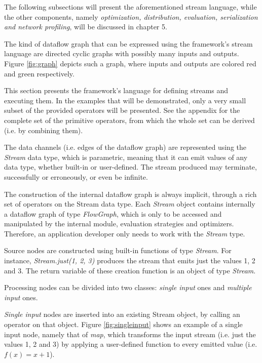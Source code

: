 \documentclass{dithesis}
\begin{document}
The following subsections will present the aforementioned stream language, while the other components, namely \textit{optimization, distribution, evaluation, serialization and network profiling}, will be discussed in chapter 5.


The kind of dataflow graph that can be expressed using the framework's stream language are directed cyclic graphs with possibly many inputs and outputs. Figure \ref{fig:graph} depicts such a graph, where inputs and outputs are colored red and green respectively.


This section presents the framework's language for defining streams and executing them. In the examples that will be demonstrated, only a very small subset of the provided operators will be presented. See the appendix for the complete set of the primitive operators, from which the whole set can be derived (i.e. by combining them).


The data channels (i.e. edges of the dataflow graph) are represented using the \textit{Stream} data type, which is parametric, meaning that it can emit values of any data type, whether built-in or user-defined. The stream produced may terminate, successfully or erroneously, or even be infinite.


The construction of the internal dataflow graph is always implicit, through a rich set of operators on the Stream data type. Each \textit{Stream} object contains internally a dataflow graph of type \textit{FlowGraph}, which is only to be accessed and manipulated by the internal module, evaluation strategies and optimizers. Therefore, an application developer only needs to work with the \textit{Stream} type.

Source nodes are constructed using built-in functions of type \textit{Stream}. For instance, \textit{Stream.just(1, 2, 3)} produces the stream that emits just the values 1, 2 and 3. The return variable of these creation function is an object of type \textit{Stream}.

Processing nodes can be divided into two classes: \textit{single input} ones and \textit{multiple input} ones. 

\textit{Single input} nodes are inserted into an existing Stream object, by calling an operator on that object. Figure \ref{fig:singleinput} shows an example of a single input node, namely that of \textit{map}, which transforms the input stream (i.e. just the values 1, 2 and 3) by applying a user-defined function to every emitted value (i.e. $f(x)=x+1$).
\end{document}
